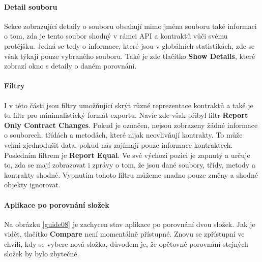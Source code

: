 		\paragraph{Detail souboru}
			Sekce zobrazující detaily o souboru obsahují mimo jména souboru také informaci o tom, zda je tento soubor shodný v rámci API a kontraktů vůči svému protějšku. Jedná se tedy o informace, které jsou v globálních statistikách, zde se však týkají pouze vybraného souboru. Také je zde tlačítko \textbf{Show Details}, které zobrazí okno s detaily o daném porovnání.\\
				
		\paragraph{Filtry}
			I v této části jsou filtry umožňující skrýt různé reprezentace kontraktů a také je tu filtr pro minimalistický formát exportu. Navíc zde však přibyl filtr \textbf{Report Only Contract Changes}. Pokud je označen, nejsou zobrazeny žádné informace o souborech, třídách a metodách, které nijak neovlivňují kontrakty. To může velmi zjednodušit data, pokud nás zajímají pouze informace  kontraktech.\\
			
			Posledním filtrem je \textbf{Report Equal}. Ve své výchozí pozici je zapnutý a určuje to, zda se mají zobrazovat i zprávy o tom, že jsou dané soubory, třídy, metody a kontrakty shodné. Vypnutím tohoto filtru můžeme snadno pouze změny a shodné objekty ignorovat.\\
		
		\paragraph{Aplikace po porovnání složek}	
			Na obrázku \ref{guide08} je zachycen stav aplikace po porovnání dvou složek. Jak je vidět, tlačítko \textbf{Compare} není momentálně přístupné. Znovu se zpřístupní ve chvíli, kdy se vybere nová složka, důvodem je, že opětovné porovnání stejných složek by bylo zbytečné.
			
